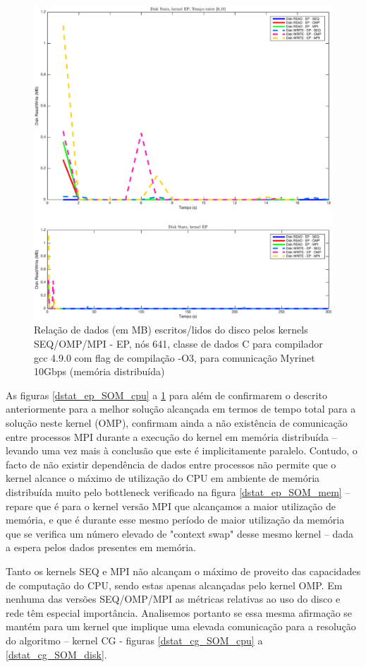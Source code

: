 \documentclass[conference,compsoc]{IEEEtran}
\begin{document}
\begin{figure}[H]
\centering
\includegraphics[width=1.1\columnwidth]{EPS/dstat_EP_seq_vs_omp_vs_mpi/disk.eps}
\caption{Relação de dados (em MB) escritos/lidos do disco pelos kernels SEQ/OMP/MPI - EP, nós 641, classe de dados C para compilador gcc 4.9.0 com flag de compilação  -O3, para comunicação Myrinet 10Gbps (memória distribuída)}
\label{dstat_ep_SOM_disk}
\end{figure}



As figuras \ref{dstat_ep_SOM_cpu} a \ref{dstat_ep_SOM_disk} para além de confirmarem o descrito anteriormente para a melhor solução alcançada em termos de tempo total para a solução neste kernel (OMP),  confirmam ainda a não existência de comunicação entre processos MPI durante a execução do kernel em memória distribuída -- levando uma vez mais à conclusão que este é implicitamente paralelo. Contudo, o facto de não existir dependência de dados entre processos não permite que o kernel alcance o máximo de utilização do CPU em ambiente de memória distribuída muito pelo bottleneck verificado na figura \ref{dstat_ep_SOM_mem} -- repare que é para o kernel versão MPI que alcançamos a maior utilização de memória, e que é durante esse mesmo período de maior utilização da memória que se verifica um número elevado de "context swap" desse mesmo kernel -- dada a espera pelos dados presentes em memória.\par 
Tanto os kernels SEQ e MPI não alcançam o máximo de proveito das capacidades de computação do CPU, sendo estas apenas alcançadas pelo kernel OMP. Em nenhuma das versões SEQ/OMP/MPI as métricas relativas ao uso do disco e rede têm especial importância. Analisemos portanto se essa mesma afirmação se mantém para um kernel que implique uma elevada comunicação para a resolução do algoritmo -- kernel CG - figuras \ref{dstat_cg_SOM_cpu} a \ref{dstat_cg_SOM_disk}.
\end{document}
